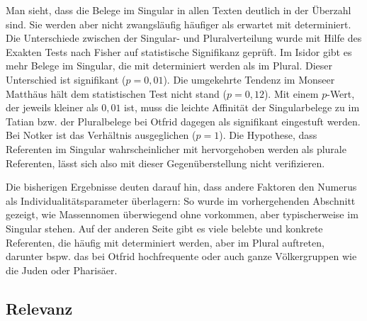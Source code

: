Man sieht, dass die Belege im Singular in allen Texten deutlich in der Überzahl sind. Sie werden aber nicht zwangsläufig häufiger als erwartet mit  determiniert. Die Unterschiede zwischen der Singular- und Pluralverteilung wurde mit Hilfe des Exakten Tests nach Fisher auf statistische Signifikanz geprüft. Im Isidor gibt es mehr Belege im Singular, die mit  determiniert werden als im Plural. Dieser Unterschied ist signifikant ($p=0,01$). Die umgekehrte Tendenz im Monseer Matthäus hält dem statistischen Test nicht stand ($p=0,12$). Mit einem $p$-Wert,
der jeweils kleiner als $0,01$ ist, muss die leichte Affinität der Singularbelege zu  im Tatian bzw. der Pluralbelege bei Otfrid dagegen als signifikant eingestuft werden. Bei Notker ist das Verhältnis ausgeglichen ($p=1$). Die Hypothese, dass Referenten im
Singular wahrscheinlicher mit  hervorgehoben werden als plurale
Referenten, lässt sich also mit dieser Gegenüberstellung nicht verifizieren. 

Die bisherigen Ergebnisse deuten darauf hin, dass andere Faktoren den Numerus als Individualitätsparameter überlagern: So wurde im vorhergehenden Abschnitt gezeigt, wie Massennomen überwiegend ohne  vorkommen, aber typischerweise im Singular stehen. Auf der anderen Seite gibt es viele belebte und konkrete Referenten, die häufig mit  determiniert werden, aber im Plural auftreten, darunter bspw. das bei Otfrid hochfrequente   oder auch ganze Völkergruppen wie die Juden oder Pharisäer.


\subsection{Relevanz}\label{sec:ergeb-relevanz}

